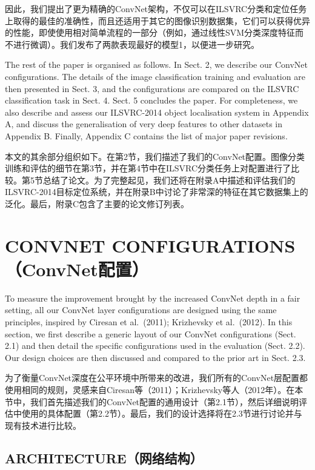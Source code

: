 \documentclass[12pt,a4paper,UTF8,twoside]{book}
\begin{document}
因此，我们提出了更为精确的ConvNet架构，不仅可以在ILSVRC分类和定位任务上取得的最佳的准确性，而且还适用于其它的图像识别数据集，它们可以获得优异的性能，即使使用相对简单流程的一部分（例如，通过线性SVM分类深度特征而不进行微调）。我们发布了两款表现最好的模型1，以便进一步研究。

The rest of the paper is organised as follows. In Sect. 2, we describe our ConvNet configurations. The details of the image classification training and evaluation are then presented in Sect. 3, and the configurations are compared on the ILSVRC classification task in Sect. 4. Sect. 5 concludes the paper. For completeness, we also describe and assess our ILSVRC-2014 object localisation system in Appendix A, and discuss the generalisation of very deep features to other datasets in Appendix B. Finally, Appendix C contains the list of major paper revisions.

本文的其余部分组织如下。在第2节，我们描述了我们的ConvNet配置。图像分类训练和评估的细节在第3节，并在第4节中在ILSVRC分类任务上对配置进行了比较。第5节总结了论文。为了完整起见，我们还将在附录A中描述和评估我们的ILSVRC-2014目标定位系统，并在附录B中讨论了非常深的特征在其它数据集上的泛化。最后，附录C包含了主要的论文修订列表。

\hypertarget{convnet-configurationsconvnetux914dux7f6e}{%
\section{CONVNET CONFIGURATIONS（ConvNet配置）}\label{convnet-configurationsconvnetux914dux7f6e}}

To measure the improvement brought by the increased ConvNet depth in a fair setting, all our ConvNet layer configurations are designed using the same principles, inspired by Ciresan et al.~(2011); Krizhevsky et al.~(2012). In this section, we first describe a generic layout of our ConvNet configurations (Sect. 2.1) and then detail the specific configurations used in the evaluation (Sect. 2.2). Our design choices are then discussed and compared to the prior art in Sect. 2.3.

为了衡量ConvNet深度在公平环境中所带来的改进，我们所有的ConvNet层配置都使用相同的规则，灵感来自Ciresan等（2011）；Krizhevsky等人（2012年）。在本节中，我们首先描述我们的ConvNet配置的通用设计（第2.1节），然后详细说明评估中使用的具体配置（第2.2节）。最后，我们的设计选择将在2.3节进行讨论并与现有技术进行比较。

\hypertarget{architectureux7f51ux7edcux7ed3ux6784}{%
\subsection{ARCHITECTURE（网络结构）}\label{architectureux7f51ux7edcux7ed3ux6784}}
\end{document}
